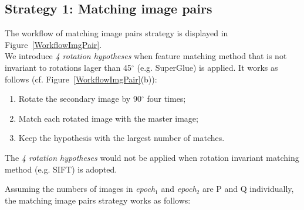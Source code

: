 \subsection{Strategy 1: Matching image pairs}
The workflow of matching image pairs strategy is displayed in Figure~\ref{WorkflowImgPair}.\\
We introduce \textit{4 rotation hypotheses} when feature matching method that is not invariant to rotations lager than 45$^\circ$ (e.g. SuperGlue) is applied. It works as follows (cf. Figure~\ref{WorkflowImgPair}(b)): 
\begin{enumerate}
    \item Rotate the secondary image by 90$^{\circ}$ four times;
    \item Match each rotated image with the master image;
    \item Keep the hypothesis with the largest number of matches.
\end{enumerate}
The \textit{4 rotation hypotheses} would not be applied when rotation invariant matching method (e.g. SIFT) is adopted.
\par
Assuming the numbers of images in \textit{epoch$_1$} and \textit{epoch$_2$} are P and Q individually, the matching image pairs strategy works as follows:\\
